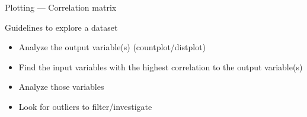 \begin{frame}{Plotting — Correlation matrix}
\end{frame}

\begin{frame}{Guidelines to explore a dataset}
  \begin{itemize}[<+->]
  \item Analyze the output variable(s) (countplot/distplot)
  \item Find the input variables with the highest correlation to the output variable(s)
  \item Analyze those variables
  \item Look for outliers to filter/investigate
  \end{itemize}
\end{frame}
